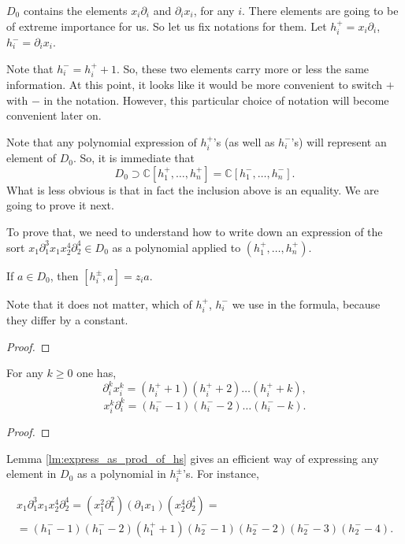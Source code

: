 \begin{example}
$D_0$ contains the elements $x_i\partial_i$ and $\partial_ix_i$, for any $i$. There elements are going to be of extreme importance for us. So let us fix notations for them. Let $h_i^+=x_i\partial_i$, $h_i^-=\partial_ix_i$. 
\end{example}
Note that $h_i^-=h_i^++1$. So, these two elements carry more or less the same information. At this point, it looks like it would be more convenient to switch $+$ with $-$ in the notation. However, this particular choice of notation will become convenient later on.

Note that any polynomial expression of $h_i^+$'s (as well as $h_i^-$'s) will represent an element of $D_0$. So, it is immediate that
$$
D_0 \supset \mathbb{C}[h_1^+,\dots,h_n^+] = \mathbb{C}[h_1^-,\dots, h_n^-].
$$
What is less obvious is that in fact the inclusion above is an equality. We are going to prove it next.

To prove that, we need to understand how to write down an expression of the sort $x_1\partial_1^3x_1x_2^4\partial_2^4 \in D_0$ as a polynomial applied to $(h_1^+,\dots, h_n^+)$.

\begin{lemma}\label{lm:action_of_h_on_D_0}
If $a\in D_0$, then $[h_i^\pm,a]=z_ia$. 
\end{lemma}
Note that it does not matter, which of $h_i^+$, $h_i^-$ we use in the formula, because they differ by a constant.
\begin{proof}

\end{proof}

\begin{lemma}\label{lm:express_as_prod_of_hs}
For any $k\ge0$ one has,
$$
\partial_i^kx_i^k=(h_i^+ + 1)(h_i^+ + 2)\dots (h_i^+ + k),
$$
$$
x_i^k\partial_i^k=(h_i^- - 1)(h_i^- - 2)\dots (h_i^- - k).
$$
\end{lemma}
\begin{proof}

\end{proof}

Lemma \ref{lm:express_as_prod_of_hs} gives an efficient way of expressing any element in $D_0$ as a polynomial in $h_i^\pm$'s.
For instance,

\begin{equation*}
\begin{array}{cc}
     x_1\partial_1^3x_1x_2^4\partial_2^4 = (x_1^2\partial_1^2)(\partial_1x_1)(x_2^4\partial_2^4)= \\
          =
    (h_1^--1)(h_1^--2)(h_1^++1)(h_2^--1)(h_2^--2)(h_2^--3)(h_2^--4).
\end{array}
\end{equation*}

